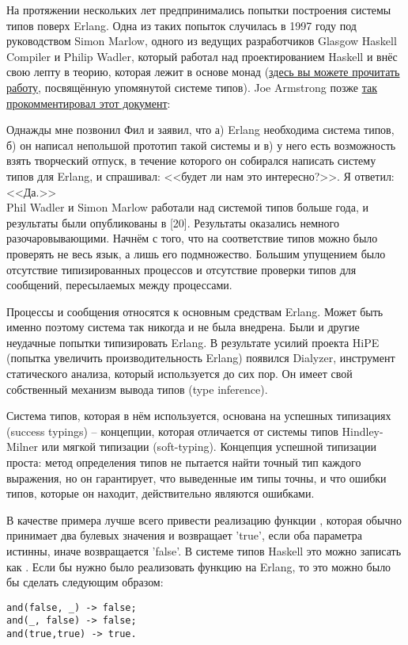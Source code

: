 На протяжении нескольких лет предпринимались попытки построения системы типов поверх Erlang.
Одна из таких попыток случилась в 1997 году под руководством Simon Marlow, одного из ведущих разработчиков Glasgow Haskell Compiler и Philip Wadler, который работал над проектированием Haskell и внёс свою лепту в теорию, которая лежит в основе монад (\href{http://www.haskell.org/~simonmar/papers/erltc.pdf}{здесь вы можете прочитать работу}, посвящённую упомянутой системе типов).
Joe Armstrong позже \href{http://www.cs.chalmers.se/Cs/Grundutb/Kurser/ppxt/HT2007/general/languages/armstrong-erlang\_history.pdf}{так прокомментировал этот документ}:\\
\colorbox{lgray}
{
    \begin{minipage}{\linewidth}
Однажды мне позвонил Фил и заявил, что а) Erlang необходима система типов, б) он написал непольшой прототип такой системы и в) у него есть возможность взять творческий отпуск, в течение которого он собирался написать систему типов для Erlang, и спрашивал: <<будет ли нам это интересно?>>.
Я ответил: <<Да.>>\\
Phil Wadler и Simon Marlow работали над системой типов больше года, и результаты были опубликованы в [20].
Результаты оказались немного разочаровывающими.
Начнём с того, что на соответствие типов можно было проверять не весь язык, а лишь его подмножество.
Большим упущением было отсутствие типизированных процессов и отсутствие проверки типов для сообщений, пересылаемых между процессами.
    \end{minipage}
}

Процессы и сообщения относятся к основным средствам Erlang.
Может быть именно поэтому система так никогда и не была внедрена.
Были и другие неудачные попытки типизировать Erlang.
В результате усилий проекта HiPE (попытка увеличить производительность Erlang) появился Dialyzer, инструмент статического анализа, который используется до сих пор.
Он имеет свой собственный механизм вывода типов (type inference).

Система типов, которая в нём используется, основана на успешных типизациях (success typings) \--- концепции, которая отличается от системы типов Hindley\--Milner или мягкой типизации (soft\--typing).
Концепция успешной типизации проста: метод определения типов не пытается найти точный тип каждого выражения, но он гарантирует, что выведенные им типы точны, и что ошибки типов, которые он находит, действительно являются ошибками.

В качестве примера лучше всего привести реализацию функции , которая обычно принимает два булевых значения и возвращает 'true', если оба параметра истинны, иначе возвращается 'false'.
В системе типов Haskell это можно записать как .
Если бы нужно было реализовать функцию  на Erlang, то это можно было бы сделать следующим образом:
\begin{lstlisting}[style=erlang]
and(false, _) -> false;
and(_, false) -> false;
and(true,true) -> true.
\end{lstlisting}

